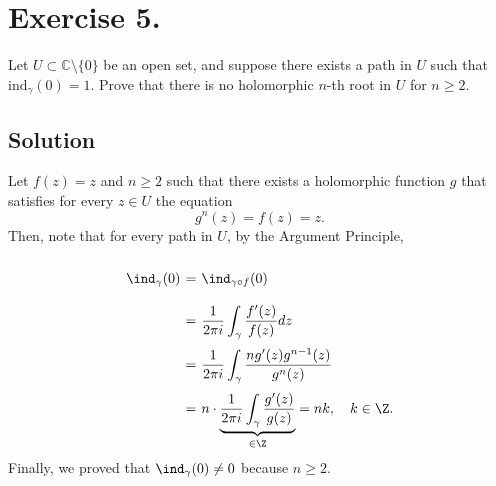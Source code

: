 \section*{Exercise 5.}

Let \( U \subset \mathbb{C} \setminus \{ 0 \} \) be an open set, and suppose there exists a path in \( U \) such that \(\mathrm{ind}_{\gamma}(0) = 1\). Prove that there is no holomorphic \(n\)-th root in \(U\) for \(n \geq 2\).

\subsection*{Solution }

Let $f(z) = z$ and $n \geq 2$ such that there exists a holomorphic function $g$ that satisfies for every $z\in U$ the equation
\[ g^n(z) = f(z) = z. \]
Then, note that for every path in $U$, by the Argument Principle,
\[ \everymath{\displaystyle}
\arraycolsep=1.8pt\def\arraystretch{2.5}
\begin{array}{rcl}
    \ind_\gamma(0) & = & \ind_{\gamma \circ f}(0)\\
    & = & \frac{1}{2\pi i} \int_{\gamma} \frac{f'(z)}{f(z)} dz\\
    & = & \frac{1}{2\pi i} \int_{\gamma} \frac{n g'(z) g^{n-1}(z)}{g^n(z)}\\
    & = & n\cdot \underbrace{\frac{1}{2\pi i}\int_{\gamma} \frac{g'(z)}{g(z)}}_{\in \Z} = nk,\hspace{1em} k\in \Z.
\end{array}\]
Finally, we proved that $\ind_\gamma(0) \neq 0$ because $n \geq 2$.
